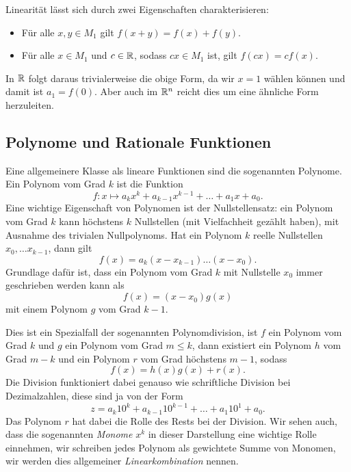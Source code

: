 Linearität lässt sich durch zwei Eigenschaften charakterisieren:
\begin{itemize}
\item {} 
Für alle \(x,y \in M_1\) gilt \(f(x+y)=f(x) + f(y) \).

\item {} 
Für alle \(x \in M_1\) und \(c \in \mathbb{R}\), sodass \(cx \in M_1\) ist, gilt \(f(cx) = c f(x)\).

\end{itemize}

In \(\mathbb{R}\) folgt daraus trivialerweise die obige Form, da wir \(x=1\) wählen können und damit ist \(a_1 = f(0)\). Aber auch im \(\mathbb{R}^n\) reicht dies um eine ähnliche Form herzuleiten.


\subsection{Polynome und Rationale Funktionen}
\label{\detokenize{vorkurs/funktionen:polynome-und-rationale-funktionen}}
Eine allgemeinere Klasse als lineare Funktionen sind die sogenannten Polynome. Ein Polynom vom Grad \(k\) ist die Funktion
\begin{equation*}
 f:x\mapsto a_k x^k + a_{k-1}x^{k-1} + \ldots + a_1 x + a_0.\end{equation*}
Eine wichtige Eigenschaft von Polynomen ist der Nullstellensatz: ein Polynom vom Grad \(k\) kann höchstens \(k\) Nullstellen (mit Vielfachheit gezählt haben), mit Ausnahme des trivialen Nullpolynoms. Hat ein Polynom \(k\) reelle Nullstellen \(x_0, \ldots x_{k-1}\), dann gilt
\begin{equation*}
 f(x) = a_k (x - x_{k-1}) \ldots (x-x_0).\end{equation*}
Grundlage dafür ist, dass ein Polynom vom Grad \(k\) mit Nullstelle \(x_0\) immer geschrieben werden kann als
\begin{equation*}
 f(x) = (x-x_0) g(x)\end{equation*}
mit einem Polynom \(g\) vom Grad \(k-1\).

Dies ist ein Spezialfall der sogenannten Polynomdivision, ist \(f\) ein Polynom vom Grad \(k\) und \(g\) ein Polynom vom Grad \(m \leq k\), dann existiert ein Polynom \(h\) vom Grad \(m-k\) und ein Polynom \(r\) vom Grad höchstens \(m-1\), sodass
\begin{equation*}
 f(x) = h(x) g(x) + r(x).
\end{equation*}
Die Division funktioniert dabei genauso wie schriftliche Division bei Dezimalzahlen, diese sind ja von der Form
\begin{equation*}
z = a_k 10^k + a_{k-1} 10^{k-1} + \ldots + a_1 10^1 + a_0.\end{equation*}
Das Polynom \(r\) hat dabei die Rolle des Rests bei der Division.  Wir sehen auch, dass die sogenannten \emph{Monome} \(x^k\) in dieser Darstellung eine wichtige Rolle einnehmen, wir schreiben jedes Polynom als gewichtete Summe von Monomen, wir werden dies allgemeiner \emph{Linearkombination} nennen.

